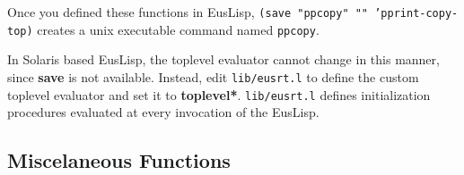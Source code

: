 Once you defined these functions in EusLisp, 
{\tt (save "ppcopy" "" 'pprint-copy-top)} creates a unix executable command
named {\tt ppcopy}. 

In Solaris based EusLisp, the toplevel evaluator cannot change in this
manner, since {\bf save} is not available.
Instead, edit {\tt lib/eusrt.l} to define the custom toplevel evaluator
and set it to {\bf *toplevel*}.
{\tt lib/eusrt.l} defines initialization procedures evaluated
at every invocation of the EusLisp.

\subsection{Miscelaneous Functions}

\begin{refdesc}



\end{refdesc}

\newpage


